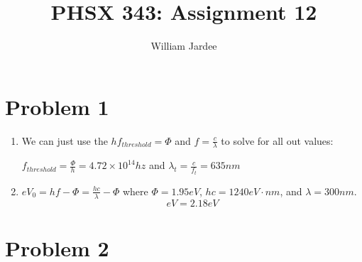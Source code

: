 \documentclass[11pt]{article}
\begin{document}
\date{}

\title{PHSX 343: Assignment 12}

\author{William Jardee}

\maketitle


\section*{Problem 1}
    \begin{enumerate}[label=\alph*)]
    \item
        We can just use the $hf_{threshold} = \Phi$ and $f = \frac{c}{\lambda}$ to solve for all out values:
        \begin{center}
            $f_{threshold} = \frac{\Phi}{h} = \boxed{4.72 \times 10^{14} hz}$ and $\lambda _t = \frac{c}{f_{t}} = \boxed{635 nm}$
        \end{center}
    \item
        $eV_0 = hf - \Phi = \frac{hc}{\lambda} - \Phi$ where $\Phi = 1.95eV$, $hc = 1240eV\cdot nm$, and $\lambda = 300nm$.
        \[\boxed{eV = 2.18 eV}\]
    
    \end{enumerate}

\section*{Problem 2}
\end{document}
